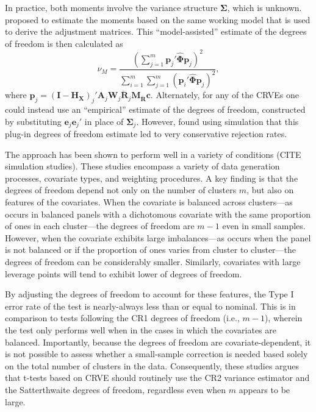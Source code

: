\documentclass[12pt]{article}
\newcommand{\bm}{\mathbf}
\newcommand{\bs}{\boldsymbol}
\begin{document}
In practice, both moments involve the variance structure $\bs\Sigma$, which is unknown. 
\citet{Bell2002bias} proposed to estimate the moments based on the same working model that is used to derive the adjustment matrices. 
This ``model-assisted'' estimate of the degrees of freedom is then calculated as 
\begin{equation}
\label{eq:nu_model}
\nu_{M} = \frac{\left(\sum_{j=1}^m \bm{p}_j' \hat{\bs\Phi} \bm{p}_j\right)^2}{\sum_{i=1}^m \sum_{j=1}^m \left(\bm{p}_i' \hat{\bs\Phi} \bm{p}_j\right)^2},
\end{equation}
where $\bm{p}_j = \left(\bm{I} - \bm{H_X}\right)_j'\bm{A}_j \bm{W}_j\bm{\ddot{R}}_j\bm{M_{\ddot{R}}} \bm{c}$.\todo{Can we use $\bm{H_{\ddot{U}}}$ here instead?} 
Alternately, for any of the CRVEs one could instead use an ``empirical'' estimate of the degrees of freedom, constructed by substituting $\bm{e}_j \bm{e}_j'$ in place of $\bs\Sigma_j$. 
However, \citet{Bell2002bias} found using simulation that this plug-in degrees of freedom estimate led to very conservative rejection rates. 

The \citet{Bell2002bias} approach has been shown to perform well in a variety of conditions (CITE simulation studies). 
These studies encompass a variety of data generation processes, covariate types, and weighting procedures. 
A key finding is that the degrees of freedom depend not only on the number of clusters $m$, but also on features of the covariates. 
When the covariate is balanced across clusters---as occurs in balanced panels with a dichotomous covariate with the same proportion of ones in each cluster---the degrees of freedom are $m - 1$ even in small samples. 
However, when the covariate exhibits large imbalances---as occurs when the panel is not balanced or if the proportion of ones varies from cluster to cluster---the degrees of freedom can be considerably smaller. 
Similarly, covariates with large leverage points will tend to exhibit lower of degrees of freedom. 


By adjusting the degrees of freedom to account for these features, the Type I error rate of the test is nearly-always less than or equal to nominal. 
This is in comparison to tests following the CR1 degrees of freedom (i.e., $m - 1$), wherein the test only performs well when in the cases in which the covariates are balanced.
Importantly, because the degrees of freedom are covariate-dependent, it is not possible to assess whether a small-sample correction is needed based solely on the total number of clusters in the data. 
Consequently, these studies argues that t-tests based on CRVE should routinely use the CR2 variance estimator and the Satterthwaite degrees of freedom, regardless even when $m$ appears to be large.
\end{document}
